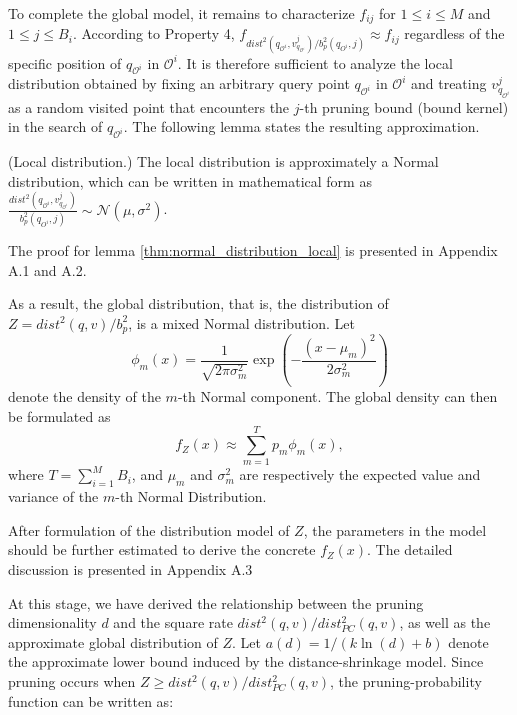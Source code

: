 To complete the global model, it remains to characterize $f_{ij}$ for $1\leq i\leq M$ and $1\leq j \leq B_i$. According to Property 4, $f_{dist^2(q_{\mathcal{O}^i},v^{j}_{q_{\mathcal{O}^i}})/b^{2}_{p}(q_{O^i},j)} \approx f_{ij}$ regardless of the specific position of $q_{\mathcal{O}^i}$ in $\mathcal{O}^i$. It is therefore sufficient to analyze the local distribution obtained by fixing an arbitrary query point $q_{\mathcal{O}^i}$ in $\mathcal{O}^i$ and treating $v^{j}_{q_{\mathcal{O}^i}}$ as a random visited point that encounters the $j$-th pruning bound (bound kernel) in the search of $q_{\mathcal{O}^i}$. The following lemma states the resulting approximation.


\begin{lemma}{(Local distribution.)}
The local distribution is approximately a Normal distribution, which can be written in mathematical form as $\frac{dist^2(q_{\mathcal{O}^i},v^{j}_{q_{\mathcal{O}^i}})}{b^2_{p}(q_{O^i},j)} \sim \mathcal{N}(\mu, \sigma^2)$.

\label{thm:normal_distribution_local}
\end{lemma}
The proof for lemma \ref{thm:normal_distribution_local} is presented in Appendix A.1 and A.2.

As a result, the global distribution, that is, the distribution of $Z=dist^2(q,v)/b_{p}^2$, is a mixed Normal distribution. Let
\[
\phi_m(x)=\frac{1}{\sqrt{2\pi\sigma^2_m}}\exp\left(-\frac{(x-\mu_m)^2}{2\sigma^2_m}\right)
\]
denote the density of the $m$-th Normal component. The global density can then be formulated as
\begin{equation}
f_Z(x)\approx \sum^{T}_{m=1}p_m\phi_m(x),
\end{equation}
 where $T=\sum^{M}_{i=1}B_i$, and $\mu_m$ and $\sigma^2_{m}$ are respectively the expected value and variance of the $m$-th Normal Distribution.

After formulation of the distribution model of $Z$, the parameters in the model should be further estimated to derive the concrete $f_Z(x)$. The detailed discussion is presented in Appendix A.3


At this stage, we have derived the relationship between the pruning dimensionality $d$ and the square rate $dist^2(q,v)/dist^2_{PC}(q,v)$, as well as the approximate global distribution of $Z$. Let $a(d)=1/(k\ln(d)+b)$ denote the approximate lower bound induced by the distance-shrinkage model. Since pruning occurs when $Z\geq dist^2(q,v)/dist^2_{PC}(q,v)$, the pruning-probability function can be written as:







